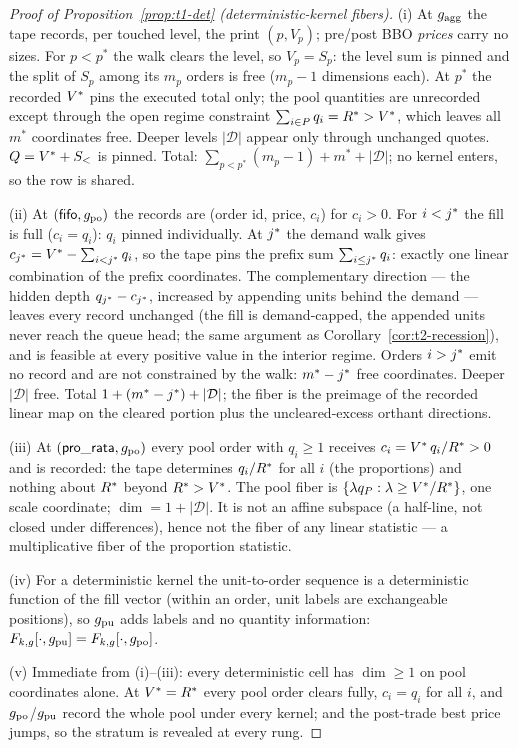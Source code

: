 \begin{proof}[Proof of Proposition~\ref{prop:t1-det} (deterministic-kernel
fibers)]
(i) At $g_{\mathrm{agg}}$ the tape records, per touched level, the print $(p, V_p)$;
pre/post BBO \emph{prices} carry no sizes. For $p < p^{*}$ the walk clears
the level, so $V_p = S_p$: the level sum is pinned and the split of $S_p$
among its $m_p$ orders is free ($m_p - 1$ dimensions each). At $p^{*}$ the
recorded $V^{*}$ pins the executed total only; the pool quantities are
unrecorded except through the open regime constraint
$\sum_{i \in P} q_i = R^{*} > V^{*}$, which leaves all $m^{*}$
coordinates free. Deeper levels $|\mathcal{D}|$ appear only through
unchanged quotes.
$Q = V^{*} + S_{<}$ is pinned. Total:
$\sum_{p < p^{*}}(m_p - 1) + m^{*} + |\mathcal{D}|$; no kernel enters, so
the row is shared.

(ii) At $(\mathsf{fifo}, g_{\mathrm{po}})$ the records are (order id, price, $c_i$) for
$c_i > 0$. For $i < j^{*}$ the fill is full ($c_i = q_i$): $q_i$ pinned
individually. At $j^{*}$ the demand walk gives
$c_{j^{*}} = V^{*} - \sum_{i < j^{*}} q_i$, so the tape pins the prefix
sum $\sum_{i \leq j^{*}} q_i$: exactly one linear combination of the
prefix coordinates. The complementary direction --- the hidden depth
$q_{j^{*}} - c_{j^{*}}$, increased by appending units behind the demand
--- leaves every record unchanged (the fill is demand-capped, the appended
units never reach the queue head; the same argument as
Corollary~\ref{cor:t2-recession}), and is feasible at every positive value
in the interior regime. Orders $i > j^{*}$ emit no record and are not
constrained by the walk: $m^{*} - j^{*}$ free coordinates. Deeper
$|\mathcal{D}|$ free. Total $1 + (m^{*} - j^{*}) + |\mathcal{D}|$; the
fiber is the preimage of the
recorded linear map on the cleared portion plus the uncleared-excess
orthant directions.

(iii) At $(\mathsf{pro\_rata}, g_{\mathrm{po}})$ every pool order with $q_i \geq 1$ receives
$c_i = V^{*}\, q_i/R^{*} > 0$ and is recorded: the tape determines
$q_i/R^{*}$ for all $i$ (the proportions) and nothing about $R^{*}$
beyond $R^{*} > V^{*}$. The pool fiber is
$\{\lambda q_{P} : \lambda \geq V^{*}/R^{*}\}$, one scale coordinate;
$\dim = 1 + |\mathcal{D}|$. It is not an affine subspace (a half-line, not closed
under differences), hence not the fiber of any linear statistic --- a
multiplicative fiber of the proportion statistic.

(iv) For a deterministic kernel the unit-to-order sequence is a
deterministic function of the fill vector (within an order, unit labels are
exchangeable positions), so $g_{\mathrm{pu}}$ adds labels and no quantity information:
$F_{k,g}[\cdot,g_{\mathrm{pu}}] = F_{k,g}[\cdot,g_{\mathrm{po}}]$.

(v) Immediate from (i)--(iii): every deterministic cell has $\dim \geq 1$
on pool coordinates alone. At $V^{*} = R^{*}$ every pool order clears
fully, $c_i = q_i$ for all $i$, and $g_{\mathrm{po}}$/$g_{\mathrm{pu}}$ record the whole pool
under every kernel; and the post-trade best price jumps, so the stratum is
revealed at every rung.
\end{proof}

